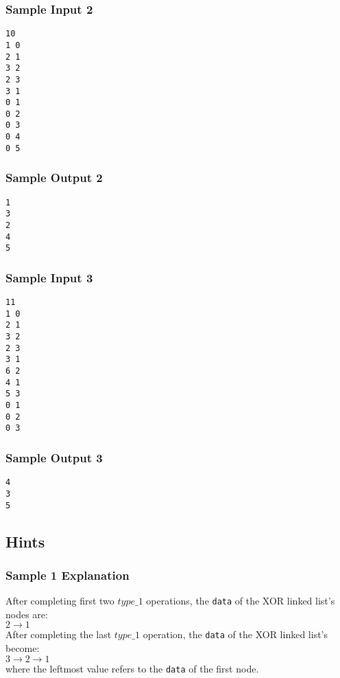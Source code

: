 \begin{multicols}{2}
\subsubsection{Sample Input 2}\label{sample-input-2}
\begin{verbatim}
10
1 0
2 1
3 2
2 3
3 1
0 1
0 2
0 3
0 4
0 5
\end{verbatim}

\columnbreak

\subsubsection{Sample Output 2}\label{sample-output-2}
\begin{verbatim}
1 
3 
2 
4 
5
\end{verbatim}
\end{multicols}

\begin{multicols}{2}
\subsubsection{Sample Input 3}\label{sample-input-3}
\begin{verbatim}
11
1 0
2 1
3 2
2 3
3 1
6 2
4 1
5 3
0 1
0 2
0 3
\end{verbatim}
    
\columnbreak
    
\subsubsection{Sample Output 3}\label{sample-output-3}
\begin{verbatim}
4
3
5
\end{verbatim}
\end{multicols}

\subsection{Hints}\label{hints}

\subsubsection{Sample 1 Explanation}\label{sample-1-explanation}

After completing first two $type\_1$ operations, the \texttt{data} of the XOR linked list's nodes are: \\
$2\rightarrow 1$ \\
After completing the last $type\_1$ operation, the \texttt{data} of the XOR linked list's become: \\
$3\rightarrow 2\rightarrow 1$ \\
where the leftmost value refers to the \texttt{data} of the first node.

